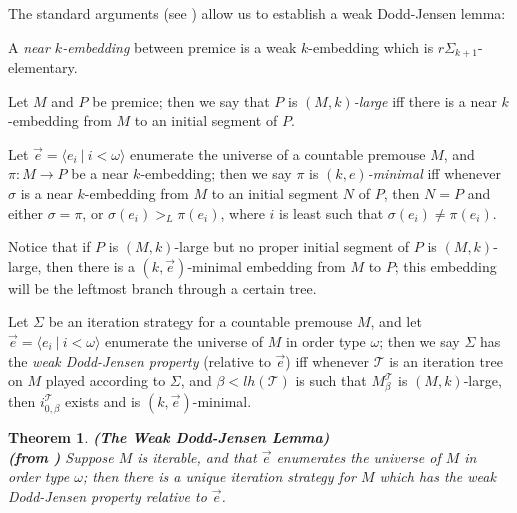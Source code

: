 \documentclass[12pt]{article}
\newtheorem{thm}{Theorem}[section]
\begin{document}
The standard arguments (see \cite{steel outline}) allow us to establish a weak Dodd-Jensen lemma:\\

\begin{def} \label{near embedding}
A \textit{near $k$-embedding} between premice is a weak $k$-embedding which is $r \Sigma_{k + 1}$-elementary.
\end{def}

\begin{def} \label{large}
Let $M$ and $P$ be premice; then we say that $P$ is $(M, k)$\textit{-large} iff there is a near $k$-embedding from $M$ to an initial segment of $P$.
\end{def}

\begin{def} \label{minimal}
Let $\vec{e} = \langle e_i \ | \  i < \omega \rangle$ enumerate the universe of a countable premouse $M$, and $\pi: M \longrightarrow P$ be a near $k$-embedding; then we say $\pi$ is $(k , e)$\textit{-minimal} iff whenever $\sigma$ is a near $k$-embedding from $M$ to an initial segment $N$ of $P$, then $N = P$ and either $\sigma = \pi$, or $\sigma ( e_i) >_L \pi (e_i)$, where $i$ is least such that $\sigma (e_i) \neq \pi (e_i)$.
\end{def}

Notice that if $P$ is $( M , k )$-large but no proper initial segment of $P$ is $(M, k)$-large, then there is a $(k , \vec{e})$-minimal embedding from $M$ to $P$; this embedding will be the leftmost branch through a certain tree.\\

\begin{def} \label{weak DJ property}
Let $\Sigma$ be an iteration strategy for a countable premouse $M$, and let $\vec{e} = \langle e_i \ | \ i < \omega \rangle$ enumerate the universe of $M$ in order type $\omega$; then we say $\Sigma$ has the \textit{weak Dodd-Jensen property} (relative to $\vec{e}$) iff whenever $\mathscr{T}$ is an iteration tree on $M$ played according to $\Sigma$, and $\beta < lh(\mathscr{T})$ is such that $M_\beta^{\mathscr{T}}$ is $(M, k)$-large, then $i_{0, \beta}^{\mathscr{T}}$ exists and is $(k, \vec{e})$-minimal.
\end{def}

\begin{thm} \textbf{(The Weak Dodd-Jensen Lemma)}\\
\textbf{(from \cite{weak DJ})}
Suppose $M$ is iterable, and that $\vec{e}$ enumerates the universe of $M$ in order type $\omega$; then there is a unique iteration strategy for $M$ which has the weak Dodd-Jensen property relative to $\vec{e}$.
\end{thm}
\end{document}
